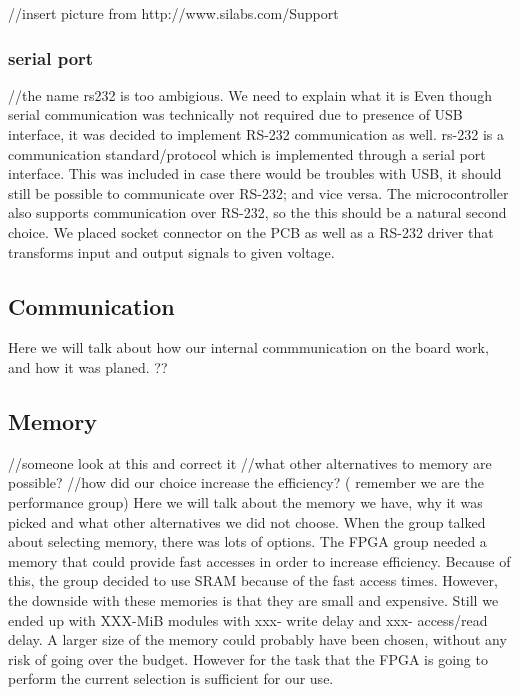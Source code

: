 //insert picture from http://www.silabs.com/Support%


\subsubsection{serial port} //the name rs232 is too ambigious. We need to explain what it is
Even though serial communication was technically not required due to presence of USB interface, it was decided to implement RS-232 communication as well.
rs-232 is a communication standard/protocol which is implemented through a serial port interface.
This was included in case there would be troubles with USB, it should still be possible to communicate over RS-232; and vice versa.
The microcontroller also supports communication over RS-232, so the this should be a natural second choice.
We placed socket connector on the PCB as well as a RS-232 driver that transforms input and output signals to given voltage.

\subsection{Communication} \label{pcb:design-choices:ss:internal_communication}

Here we will talk about how our internal commmunication on the board work, and how it was planed.
??


\subsection{Memory} \label{pcb:design-choices:ss:memory}
//someone look at this and correct it
//what other alternatives to memory are possible?
//how did our choice increase the efficiency? ( remember we are the performance group)
Here we will talk about the memory we have, why it was picked and what other alternatives we did not choose.
When the group talked about selecting memory, there was lots of options. The FPGA group needed a memory that could provide 
fast accesses in order to increase efficiency. Because of this, the group decided to use SRAM because of the fast access times.
However, the downside with these memories is that they are small and expensive. Still we ended up with XXX-MiB modules with xxx- write delay and xxx- access/read delay.
A larger size of the memory could probably have been chosen, without any risk of going over the budget. However for the task that the FPGA is going to perform
the current selection is sufficient for our use.
